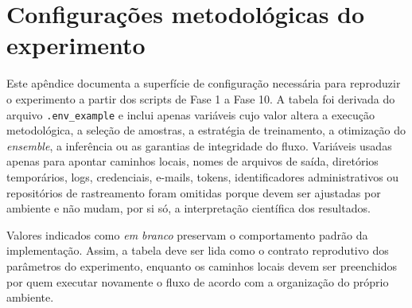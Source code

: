 \chapter{Configurações metodológicas do experimento}\label{ap:configs_reportar}

Este apêndice documenta a superfície de configuração necessária para reproduzir
o experimento a partir dos scripts de Fase 1 a Fase 10. A tabela foi derivada do
arquivo \texttt{.env\_example} e inclui apenas variáveis cujo valor altera a
execução metodológica, a seleção de amostras, a estratégia de treinamento, a
otimização do \textit{ensemble}, a inferência ou as garantias de integridade do
fluxo. Variáveis usadas apenas para apontar caminhos locais, nomes de arquivos
de saída, diretórios temporários, logs, credenciais, e-mails, tokens,
identificadores administrativos ou repositórios de rastreamento foram omitidas
porque devem ser ajustadas por ambiente e não mudam, por si só, a interpretação
científica dos resultados.

Valores indicados como \emph{em branco} preservam o comportamento padrão da
implementação. Assim, a tabela deve ser lida como o contrato reprodutivo dos
parâmetros do experimento, enquanto os caminhos locais devem ser preenchidos por
quem executar novamente o fluxo de acordo com a organização do próprio ambiente.

